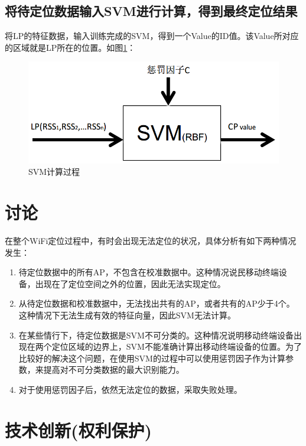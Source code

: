 \documentclass[a4paper, UTF8, twocolumn ]{ctexart}
\begin{document}
\subsection{将待定位数据输入SVM进行计算，得到最终定位结果}
将LP的特征数据，输入训练完成的SVM，得到一个Value的ID值。该Value所对应的区域就是LP所在的位置。如图\ref{fig:no10}：
\begin{figure}[!ht]\centering
  \includegraphics[keepaspectratio, scale=0.3]{no10.png}
  \caption{SVM计算过程\label{fig:no10}} 
\end{figure}

\section{讨论}
在整个WiFi定位过程中，有时会出现无法定位的状况，具体分析有如下两种情况发生：
\begin{enumerate}
\item 待定位数据中的所有AP，不包含在校准数据中。这种情况说民移动终端设备，出现在了定位空间之外的位置，因此无法实现定位。
\item 从待定位数据和校准数据中，无法找出共有的AP，或者共有的AP少于4个。这种情况下无法生成有效的特征向量，因此SVM无法计算。
\item 在某些情行下，待定位数据是SVM不可分类的。这种情况说明移动终端设备出现在两个定位区域的边界上，SVM不能准确计算出移动终端设备的位置。为了比较好的解决这个问题，在使用SVM的过程中可以使用惩罚因子作为计算参数，来提高对不可分类数据的最大识别能力。
\item 对于使用惩罚因子后，依然无法定位的数据，采取失败处理。
\end{enumerate}


\section{技术创新(权利保护)}
\end{document}

